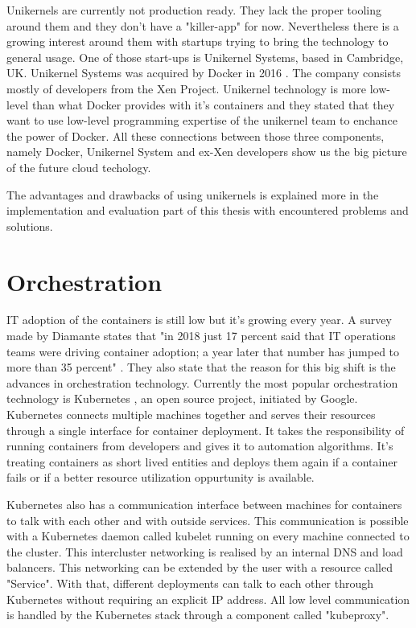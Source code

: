 Unikernels are currently not production ready. \cite{unfit-for-production} They lack the proper tooling around them and they don't have a "killer-app" for now. Nevertheless there is a growing interest around them with startups trying to bring the technology to general usage. One of those start-ups is Unikernel Systems, based in Cambridge, UK. Unikernel Systems was acquired by Docker in 2016 \cite{docker-acquisiton}. The company consists mostly of developers from the Xen Project. Unikernel technology is more low-level than what Docker provides with it's containers and they stated that they want to use low-level programming expertise of the unikernel team to enchance the power of Docker. All these connections between those three components, namely Docker, Unikernel System and ex-Xen developers show us the big picture of the future cloud techology.

The advantages and drawbacks of using unikernels is explained more in the implementation and evaluation part of this thesis with encountered problems and solutions.

\section{Orchestration}
IT adoption of the containers is still low but it's growing every year. A survey made by Diamante states that "in 2018 just 17 percent said that IT operations teams were driving container adoption; a year later that number has jumped to more than 35 percent" \cite{diamante}. They also state that the reason for this big shift is the advances in orchestration technology. Currently the most popular orchestration technology is Kubernetes , an open source project, initiated by Google. Kubernetes connects multiple machines together and serves their resources through a single interface for container deployment. It takes the responsibility of running containers from developers and gives it to automation algorithms. It's treating containers as short lived entities and deploys them again if a container fails or if a better resource utilization oppurtunity is available.

Kubernetes also has a communication interface between machines for containers to talk with each other and with outside services. This communication is possible with a Kubernetes daemon called kubelet running on every machine connected to the cluster. This intercluster networking is realised by an internal DNS and load balancers. This networking can be extended by the user with a resource called "Service". With that, different deployments can talk to each other through Kubernetes without requiring an explicit IP address. All low level communication is handled by the Kubernetes stack through a component called "kubeproxy".

